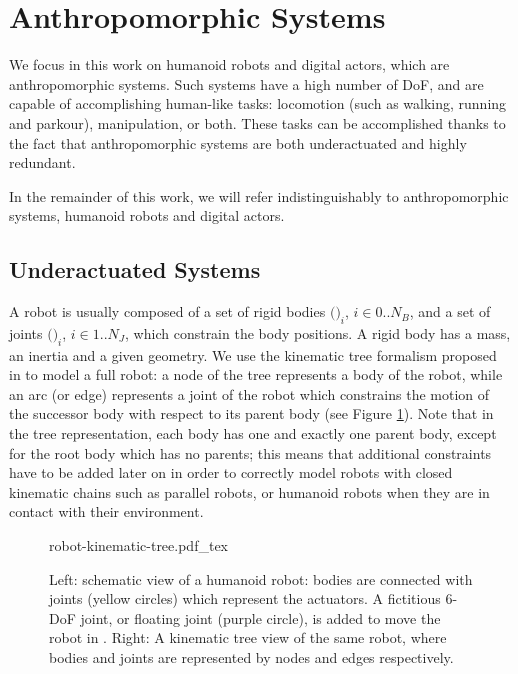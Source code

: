 \section{Anthropomorphic Systems}
\label{sec:chap1-anthropomorphic-systems}

We focus in this work on humanoid robots and digital actors, which are
anthropomorphic systems. Such systems have a high number of DoF, and
are capable of accomplishing human-like tasks: locomotion (such as
walking, running and parkour), manipulation, or both. These tasks can
be accomplished thanks to the fact that anthropomorphic systems are
both underactuated and highly redundant.

In the remainder of this work, we will refer indistinguishably to
anthropomorphic systems, humanoid robots and digital actors.

\subsection{Underactuated Systems}
\label{subsec:chap1-underactuated-systems}

A robot {\robot} is usually composed of a set of rigid bodies
$($$)_i$, $i \in 0..N_B$, and a set of joints
$($$)_i$, $i \in 1..N_J$, which constrain the body
positions. A rigid body has a mass, an inertia and a given
geometry. We use the kinematic tree formalism proposed in
\cite{feat08} to model a full robot: a node of the tree represents a
body of the robot, while an arc (or edge) represents a joint 
of the robot which constrains the motion of the successor body
 with respect to its parent body  (see
Figure \ref{fig:chap1-robot-kinematic-tree}). Note that in the tree
representation, each body has one and exactly one parent body, except
for the root body which has no parents; this means that additional
constraints have to be added later on in order to correctly model
robots with closed kinematic chains such as parallel robots, or
humanoid robots when they are in contact with their environment.

\begin{figure}
  \centering
      {\def\svgwidth{0.8\linewidth}
        
                   {robot-kinematic-tree.pdf_tex}}
      \caption{Left: schematic view of a humanoid robot: bodies
        are connected with joints (yellow circles) which represent the
        actuators. A fictitious 6-DoF joint, or floating joint (purple
        circle), is added to move the robot in {\segroup}. Right: A
        kinematic tree view of the same robot, where bodies and joints
        are represented by nodes and edges respectively.}
      \label{fig:chap1-robot-kinematic-tree}
\end{figure}

